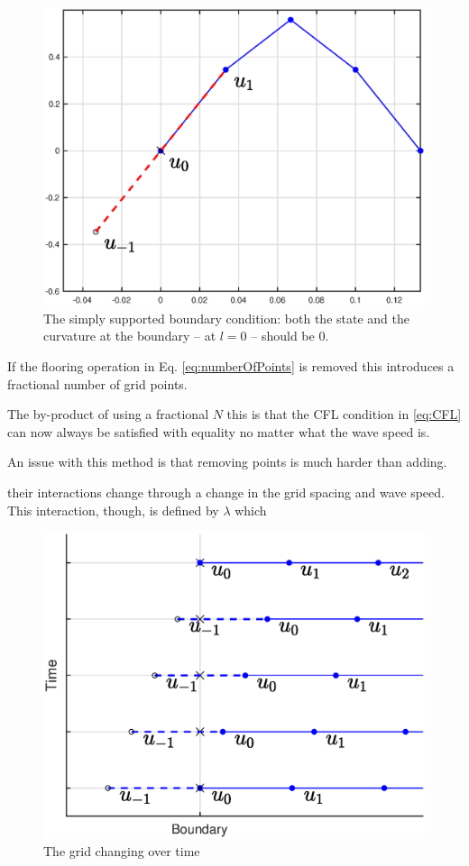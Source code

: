 \documentclass[dvipsnames, reprint]{JASA}
\def\SWcomment[#1]{\textcolor{Bittersweet}{#1}}
\begin{document}
\begin{figure}
\includegraphics[width=\reprintcolumnwidth]{simplySupportedBoundary}
\caption{\label{fig:simplySupportedBound}{The simply supported boundary condition: both the state and the curvature at the boundary -- at $l=0$ -- should be $0$.}}
\end{figure} 

If the flooring operation in Eq. \eqref{eq:numberOfPoints} is removed this introduces a fractional number of grid points.


The by-product of using a fractional $N$ this is that the CFL condition in \eqref{eq:CFL} can now always be satisfied with equality no matter what the wave speed is.

An issue with this method is that removing points is much harder than adding.

their interactions change through a change in the grid spacing and wave speed. This interaction, though, is defined by $\lambda$ which 

\begin{figure}
\includegraphics[width=\reprintcolumnwidth]{boundaryGrid}
\caption{\label{fig:changingBoundary}{The grid changing over time}}
\end{figure} 


\end{document}
